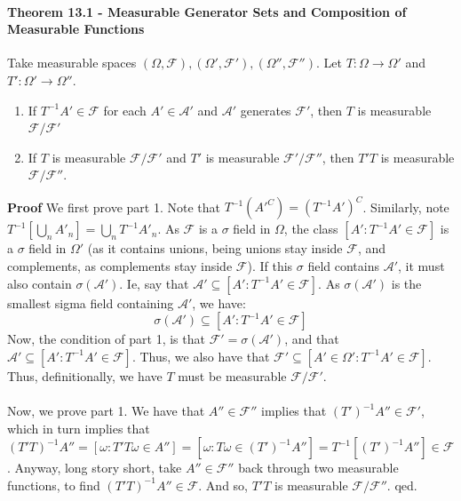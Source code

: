 \documentclass[12pt,a4paper]{article}
\newcommand{\1}[1]{\mathbbm{1}\left\{ #1 \right\}}
\newcommand{\acal}{\mathcal{A}}
\newcommand{\fcal}{\mathcal{F}}
\begin{document}
\paragraph{Theorem 13.1 - Measurable Generator Sets and Composition of Measurable Functions} Take measurable spaces $(\Omega,\fcal),(\Omega',\fcal'),(\Omega'',\fcal'')$. Let $T: \Omega \to \Omega'$ and $T': \Omega' \to \Omega''$.
\begin{enumerate}
	\item If $T^{-1}A' \in \fcal$ for each $A' \in \acal'$ and $\acal'$ generates $\fcal'$, then $T$ is measurable $\fcal/\fcal'$
	
	\item If $T$ is measurable $\fcal/\fcal'$ and $T'$ is measurable $\fcal'/\fcal''$, then $T'T$ is measurable $\fcal/\fcal''$.
\end{enumerate}
\textbf{Proof} We first prove part 1. Note that $T^{-1}(A'^C) = (T^{-1}A')^C$. Similarly, note $T^{-1}\left[\bigcup_n A'_n\right] = \bigcup_n T^{-1}A'_n$. As $\fcal$ is a $\sigma$ field in $\Omega$, the class $[A' : T^{-1}A' \in \fcal]$ is a $\sigma$ field in $\Omega'$ (as it contains unions, being unions stay inside $\fcal$, and complements, as complements stay inside $\fcal$). If this $\sigma$ field contains $\acal'$, it must also contain $\sigma(\acal')$. Ie, say that $\acal' \subseteq [A' : T^{-1}A' \in \fcal]$. As $\sigma(\acal')$ is the smallest sigma field containing $\acal'$, we have:
$$
	\sigma(\acal') \subseteq [A' : T^{-1}A' \in \fcal]
$$
Now, the condition of part 1, is that $\fcal' = \sigma(\acal')$, and that $\acal' \subseteq [A' : T^{-1}A' \in \fcal]$. Thus, we also have that $\fcal' \subseteq [A' \in \Omega' : T^{-1}A' \in \fcal]$. Thus, definitionally, we have $T$ must be measurable $\fcal/\fcal'$.
\\\\
Now, we prove part 1. We have that $A'' \in \fcal''$ implies that $(T')^{-1}A'' \in \fcal'$, which in turn implies that $(T'T)^{-1}A'' = \left[\omega : T'T\omega \in A''\right] = \left[\omega: T\omega \in (T')^{-1}A''\right] = T^{-1}\left[(T')^{-1}A''\right] \in \fcal$. Anyway, long story short, take $A'' \in \fcal''$ back through two measurable functions, to find $(T'T)^{-1}A'' \in \fcal$. And so, $T'T$ is measurable $\fcal/\fcal''$. qed.
\end{document}
